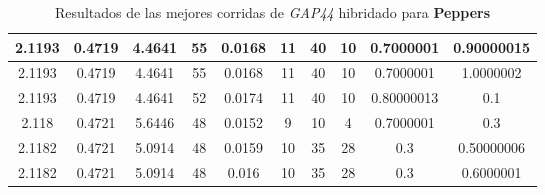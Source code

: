 \begin{table}[h!]
\begin{center}
\begin{tabular}{|c|c|c|c|c|c|c|c|c|c|}
        \hline
        \hline
            2.1193 & 0.4719  & 4.4641 & 55 & 0.0168 & 11 & 40 & 10 & 0.7000001 & 0.90000015\\
        \hline
        \hline
            2.1193 & 0.4719  & 4.4641 & 55 & 0.0168 & 11 & 40 & 10 & 0.7000001 & 1.0000002\\
        \hline
        \hline
            2.1193 & 0.4719  & 4.4641 & 52 & 0.0174 & 11 & 40 & 10 & 0.80000013 & 0.1\\
        \hline
        \hline
            2.118 & 0.4721  & 5.6446 & 48 & 0.0152 & 9 & 10 & 4 & 0.7000001 & 0.3\\
        \hline
        \hline
            2.1182 & 0.4721  & 5.0914 & 48 & 0.0159 & 10 & 35 & 28 & 0.3 & 0.50000006\\
        \hline
        \hline
            2.1182 & 0.4721  & 5.0914 & 48 & 0.016 & 10 & 35 & 28 & 0.3 & 0.6000001\\
        \hline
        \end{tabular}
        \caption{Resultados de las mejores corridas de \emph{GAP44} hibridado para {\bf Peppers}}
        \label{tb:tableGAP44}
    \end{center}
\end{table}
